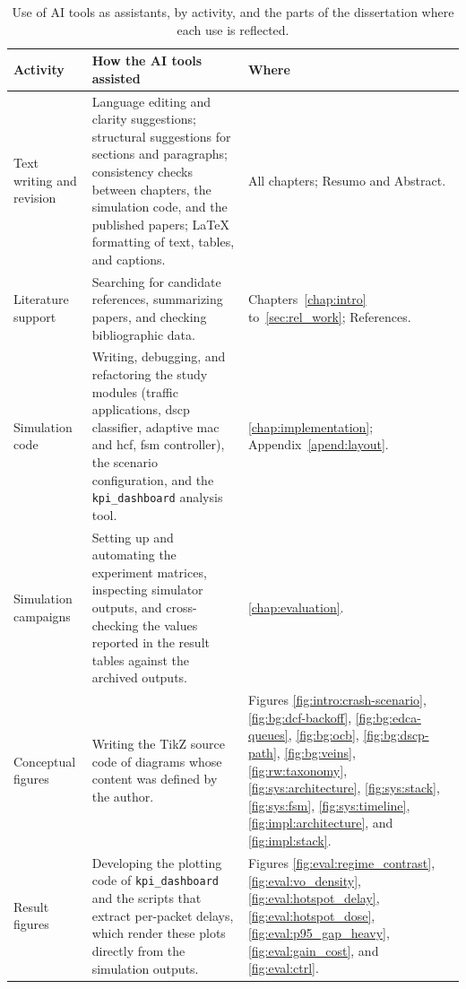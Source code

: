 \begin{table}[htb]
	\ABNTEXfontereduzida
	\caption{\label{tab:ai:use}Use of AI tools as assistants, by activity, and the parts of the dissertation where each use is reflected.}
	\begin{center}
		\begin{tabularx}{\linewidth}{@{}>{\raggedright\arraybackslash}p{2.6cm} >{\raggedright\arraybackslash}X >{\raggedright\arraybackslash}p{4.4cm}@{}}
			\toprule
			\textbf{Activity} & \textbf{How the AI tools assisted} & \textbf{Where} \\
			\midrule
			Text writing and revision &
			  Language editing and clarity suggestions; structural suggestions for sections and paragraphs; consistency checks between chapters, the simulation code, and the published papers; \LaTeX{} formatting of text, tables, and captions. &
			  All chapters; Resumo and Abstract. \\
			\addlinespace
			Literature support &
			  Searching for candidate references, summarizing papers, and checking bibliographic data. &
			  Chapters~\ref{chap:intro} to~\ref{sec:rel_work}; References. \\
			\addlinespace
			Simulation code &
			  Writing, debugging, and refactoring the study modules (traffic applications, \gls*{dscp} classifier, adaptive \gls*{mac} and \gls*{hcf}, \gls*{fsm} controller), the scenario configuration, and the \texttt{kpi\_dashboard} analysis tool. &
			  \autoref{chap:implementation}; Appendix~\ref{apend:layout}. \\
			\addlinespace
			Simulation campaigns &
			  Setting up and automating the experiment matrices, inspecting simulator outputs, and cross-checking the values reported in the result tables against the archived outputs. &
			  \autoref{chap:evaluation}. \\
			\addlinespace
			Conceptual figures &
			  Writing the TikZ source code of diagrams whose content was defined by the author. &
			  Figures \ref{fig:intro:crash-scenario}, \ref{fig:bg:dcf-backoff}, \ref{fig:bg:edca-queues}, \ref{fig:bg:ocb}, \ref{fig:bg:dscp-path}, \ref{fig:bg:veins}, \ref{fig:rw:taxonomy}, \ref{fig:sys:architecture}, \ref{fig:sys:stack}, \ref{fig:sys:fsm}, \ref{fig:sys:timeline}, \ref{fig:impl:architecture}, and \ref{fig:impl:stack}. \\
			\addlinespace
			Result figures &
			  Developing the plotting code of \texttt{kpi\_dashboard} and the scripts that extract per-packet delays, which render these plots directly from the simulation outputs. &
			  Figures \ref{fig:eval:regime_contrast}, \ref{fig:eval:vo_density}, \ref{fig:eval:hotspot_delay}, \ref{fig:eval:hotspot_dose}, \ref{fig:eval:p95_gap_heavy}, \ref{fig:eval:gain_cost}, and \ref{fig:eval:ctrl}. \\

\end{tabularx}
\end{center}
\end{table}
